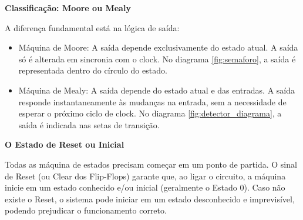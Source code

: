 \documentclass[12pt]{article}
\begin{document}
\textbf{Classificação: Moore ou Mealy}

A diferença fundamental está na lógica de saída:
\begin{itemize}
    \item Máquina de Moore: A saída depende exclusivamente do estado atual. A saída só é alterada em sincronia com o clock. No diagrama \ref{fig:semaforo}, a saída é representada dentro do círculo do estado.
    \item Máquina de Mealy: A saída depende do estado atual e das entradas. A saída responde instantaneamente às mudanças na entrada, sem a necessidade de esperar o próximo ciclo de clock. No diagrama \ref{fig:detector_diagrama}, a saída é indicada nas setas de transição.
\end{itemize}

\textbf{O Estado de Reset ou Inicial}

Todas as máquina de estados precisam começar em um ponto de partida.
O sinal de Reset (ou Clear dos Flip-Flops) garante que, ao ligar o circuito, a máquina inicie em um estado conhecido e/ou inicial (geralmente o Estado 0).
Caso não existe o Reset, o sistema pode iniciar em um estado desconhecido e imprevisível, podendo prejudicar o funcionamento correto.
\end{document}
